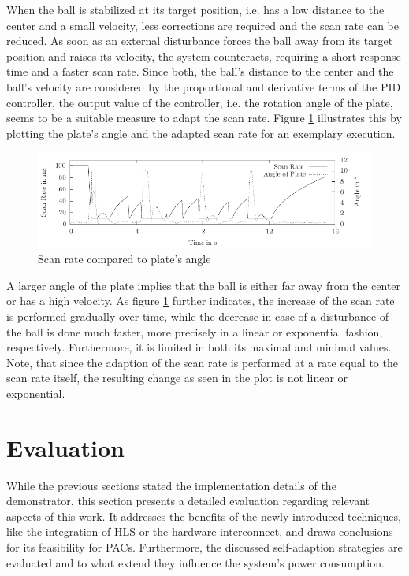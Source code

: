 When the ball is stabilized at its target position, i.e. has a low distance to
the center and a small velocity, less corrections are required and the scan
rate can be reduced. As soon as an external disturbance forces the ball away
from its target position and raises its velocity, the system counteracts,
requiring a short response time and a faster scan rate. Since both, the ball's
distance to the center and the ball's velocity are considered by the
proportional and derivative terms of the \ac{PID} controller, the output value
of the controller, i.e. the rotation angle of the plate, seems to be a
suitable measure to adapt the scan rate. Figure \ref{fig:selfadapt_a}
illustrates this by plotting the plate's angle and the adapted scan rate for
an exemplary execution.
\begin{figure}
	\centering
	\includegraphics{../figures/selfadapt_a}
	\caption{Scan rate compared to plate's angle}
	\label{fig:selfadapt_a}
\end{figure}
A larger angle of the plate implies that the ball is either far away from the
center or has a high velocity. As figure \ref{fig:selfadapt_a} further
indicates, the increase of the scan rate is performed gradually over time,
while the decrease in case of a disturbance of the ball is done much faster,
more precisely in a linear or exponential fashion, respectively. Furthermore,
it is limited in both its maximal and minimal values. Note, that since the
adaption of the scan rate is performed at a rate equal to the scan rate
itself, the resulting change as seen in the plot is not linear or exponential.

\section{Evaluation}
While the previous sections stated the implementation details of the
demonstrator, this section presents a detailed evaluation regarding relevant
aspects of this work. It addresses the benefits of the newly introduced
techniques, like the integration of \ac{HLS} or the hardware interconnect, and
draws conclusions for its feasibility for \acp{PAC}. Furthermore, the
discussed self-adaption strategies are evaluated and to what extend they
influence the system's power consumption.

